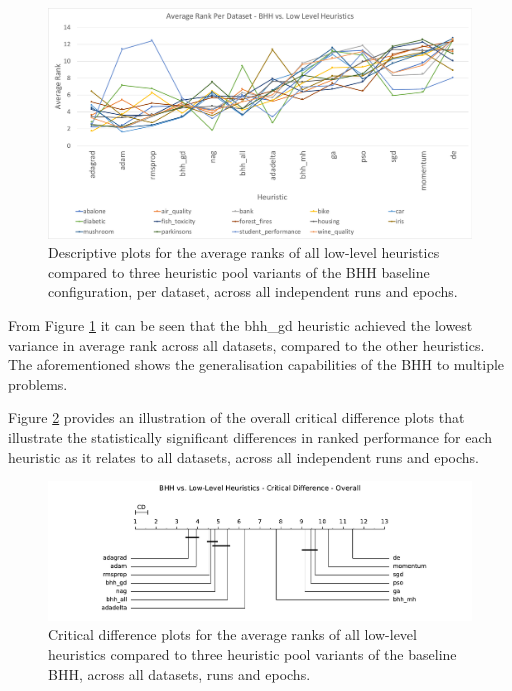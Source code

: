 \documentclass[preprint,review,12pt]{elsarticle}
\begin{document}
\begin{figure}[htb]
	\centering
	\includegraphics[width=\textwidth]{standalone_descriptive.pdf}
	\caption{Descriptive plots for the average ranks of all low-level heuristics compared to three heuristic pool variants of the \acs{BHH} baseline configuration, per dataset, across all independent runs and epochs.}
	\label{fig:results:standalone:descriptive:descriptive}
\end{figure}

From Figure \ref{fig:results:standalone:descriptive:descriptive} it can be seen that the bhh\_gd heuristic achieved the lowest variance in average rank across all datasets, compared to the other heuristics. The aforementioned shows the generalisation capabilities of the \acs{BHH} to multiple problems.

Figure \ref{fig:results:standalone:descriptive:cd} provides an illustration of the overall critical difference plots that illustrate the statistically significant differences in ranked performance for each heuristic as it relates to all datasets, across all independent runs and epochs.

\begin{figure}[htb]
	\centering
	\includegraphics[width=\textwidth]{standalone_cd_overall.pdf}
	\caption{Critical difference plots for the average ranks of all low-level heuristics compared to three heuristic pool variants of the baseline \acs{BHH}, across all datasets, runs and epochs.}
	\label{fig:results:standalone:descriptive:cd}
\end{figure}
\end{document}
